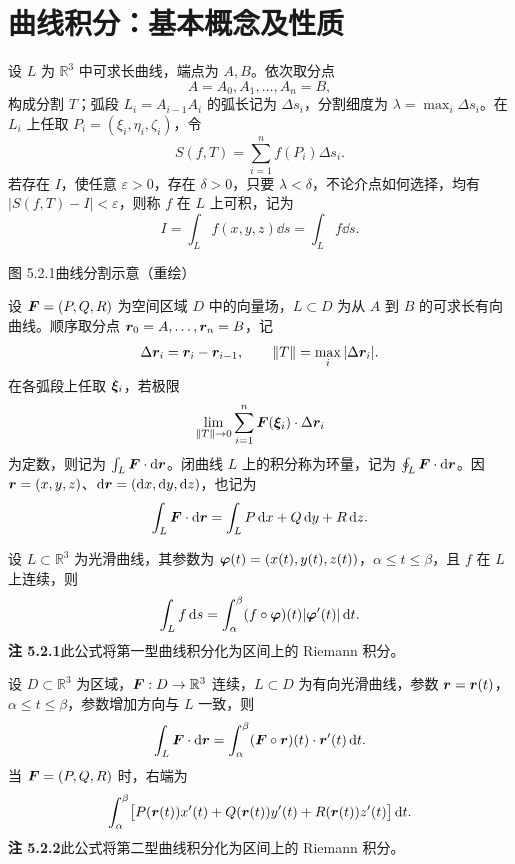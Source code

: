 \section{曲线积分：基本概念及性质}
设 $L$ 为 $\mathbb R^3$ 中可求长曲线，端点为 $A,B$。依次取分点
\[
A=A_0,A_1,\ldots,A_n=B,
\]
构成分割 $T$；弧段 $L_i=A_{i-1}A_i$ 的弧长记为 $\Delta s_i$，分割细度为 $\lambda=\max_i\Delta s_i$。在 $L_i$ 上任取 $P_i=(\xi_i,\eta_i,\zeta_i)$，令
\[
S(f,T)=\sum_{i=1}^n f(P_i)\Delta s_i.
\]
若存在 $I$，使任意 $\varepsilon>0$，存在 $\delta>0$，只要 $\lambda<\delta$，不论介点如何选择，均有 $|S(f,T)-I|<\varepsilon$，则称 $f$ 在 $L$ 上可积，记为
\[
I=\int_L f(x,y,z)\dd s=\int_L f\dd s.
\]
\begin{center}\begin{minipage}{\linewidth}\centering
{}
\par{\small 图 5.2.1\quad 曲线分割示意（重绘）}
\end{minipage}\end{center}

设 $\bm{F}=(P,Q,R)$ 为空间区域 $D$ 中的向量场，$L\subset D$ 为从 $A$ 到 $B$ 的可求长有向曲线。顺序取分点 $\bm{r}_0=A,\ldots,\bm{r}_n=B$，记
\[
\Delta\bm{r}_i=\bm{r}_i-\bm{r}_{i-1},\qquad \|T\|=\max_i|\Delta\bm{r}_i|.
\]
在各弧段上任取 $\bm{\xi}_i$，若极限
\[
\lim_{\|T\|\to0}\sum_{i=1}^n\bm{F}(\bm{\xi}_i)\cdot\Delta\bm{r}_i
\]
为定数，则记为 $\int_L\bm{F}\cdot\mathop{}\!\mathrm d\bm{r}$。闭曲线 $L$ 上的积分称为环量，记为 $\oint_L\bm{F}\cdot\mathop{}\!\mathrm d\bm{r}$。因 $\bm{r}=(x,y,z)$、$\mathop{}\!\mathrm d\bm{r}=(\mathop{}\!\mathrm d x,\mathop{}\!\mathrm d y,\mathop{}\!\mathrm d z)$，也记为
\[
\int_L\bm{F}\cdot\mathop{}\!\mathrm d\bm{r}=\int_L P\mathop{}\!\mathrm d x+Q\mathop{}\!\mathrm d y+R\mathop{}\!\mathrm d z.
\]

设 $L\subset\mathbb R^3$ 为光滑曲线，其参数为
$\bm{\varphi}(t)=(x(t),y(t),z(t))$，$\alpha\le t\le\beta$，且 $f$ 在 $L$ 上连续，则
\[
\int_L f\mathop{}\!\mathrm d s=\int_\alpha^\beta(f\circ\bm{\varphi})(t)|\bm{\varphi}'(t)|\mathop{}\!\mathrm d t.
\]
\textbf{注 5.2.1}\quad 此公式将第一型曲线积分化为区间上的 Riemann 积分。

设 $D\subset\mathbb R^3$ 为区域，$\bm{F}:D\to\mathbb R^3$ 连续，$L\subset D$ 为有向光滑曲线，参数 $\bm{r}=\bm{r}(t)$，$\alpha\le t\le\beta$，参数增加方向与 $L$ 一致，则
\[
\int_L\bm{F}\cdot\mathop{}\!\mathrm d\bm{r}=\int_\alpha^\beta(\bm{F}\circ\bm{r})(t)\cdot\bm{r}'(t)\mathop{}\!\mathrm d t.
\]
当 $\bm{F}=(P,Q,R)$ 时，右端为
\[
\int_\alpha^\beta\bigl[P(\bm{r}(t))x'(t)+Q(\bm{r}(t))y'(t)+R(\bm{r}(t))z'(t)\bigr]\mathop{}\!\mathrm d t.
\]
\textbf{注 5.2.2}\quad 此公式将第二型曲线积分化为区间上的 Riemann 积分。

